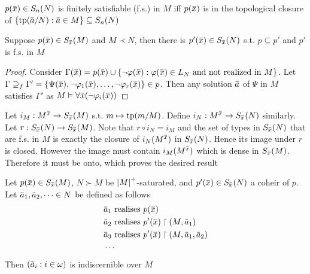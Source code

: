 \documentclass[11pt]{article}
\begin{document}
\begin{remark}
\(p(\barx)\in S_n(N)\) is finitely satisfiable (f.s.) in \(M\) iff \(p(\barx)\) is in the
topological closure of \(\{\tp(\bara/N):\bara\in M\}\subseteq S_n(N)\)
\end{remark}

\begin{lemma}[]
\label{P2.8}
Suppose \(p(\barx)\in S_{\barx}(M)\) and \(M\prec N\), then there is \(p'(\barx)\in S_{\barx}(N)\)
s.t. \(p\subseteq p'\) and \(p'\) is f.s. in \(M\)
\end{lemma}

\begin{proof}
Consider \(\Gamma(\barx)=p(\barx)\cup\{\neg\varphi(\barx):\varphi(\barx)\in L_N\text{ and not realized in }M\}\). Let
\(\Gamma\supseteq_f\Gamma'=\{\Psi(\barx),\neg\varphi_1(\barx),\dots,\neg\varphi_r(\barx)\}\in p\). Then any solution \(\bara\) of \(\Psi\) in \(M\)
satisfies \(\Gamma'\) as \(M\vDash\forall\barx(\neg\varphi_i(\barx))\)
\end{proof}

\begin{remark}
Let \(i_M:M^{\barx}\to S_{\barx}(M)\) s.t. \(m\mapsto\operatorname{tp}(m/M)\). Define \(i_N:M^{\barx}\to S_{\barx}(N)\)
similarly. Let \(r:S_{\barx}(N)\to S_{\barx}(M)\). Note that \(r\circ i_N=i_M\) and the set of types
in \(S_{\barx}(N)\) that are f.s. in \(M\) is exactly the closure of \(i_N(M^{\barx})\)
in \(S_{\barx}(N)\). Hence its image under \(r\) is closed. However the image must
contain \(i_M(M^{\barx})\) which is dense in \(S_{\barx}(M)\). Therefore it must be onto, which
proves the desired result

\end{remark}

\begin{proposition}[]
Let \(p(\barx)\in S_{\barx}(M)\), \(N\succ M\) be \(\abs{M}^+\)-saturated,
and \(p'(\barx)\in S_{\barx}(N)\) a coheir of \(p\). Let \(\bara_1,\bara_2,\dots\in N\) be defined as
follows
\begin{align*}
&\bara_1\text{ realises }p(\barx)\\
&\bara_2\text{ realises }p'(\barx)\uhr(M,\bara_1)\\
&\bara_3\text{ realises }p'(\barx)\uhr(M,\bara_1,\bara_2)\\
&\cdots
\end{align*}
Then \((\bara_i:i\in\omega)\) is indiscernible over \(M\)
\end{proposition}
\end{document}
